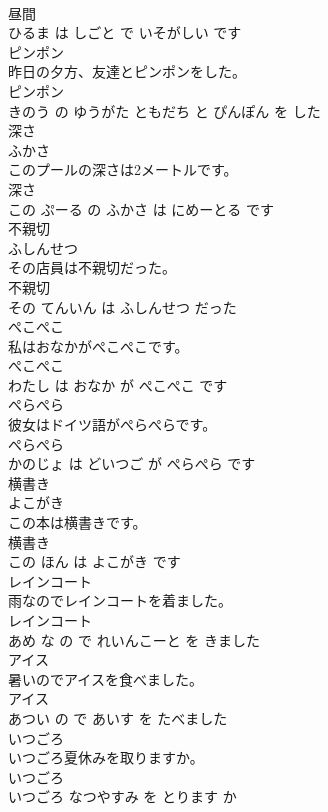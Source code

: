\documentclass[8pt]{extreport}
\begin{document}
\begin{CJK}{UTF8}{min}
\\	昼間 
\\	ひるま は しごと で いそがしい です			
\\	ピンポン	
\\	昨日の夕方、友達とピンポンをした。	
\\	ピンポン 
\\	きのう の ゆうがた ともだち と ぴんぽん を した			
\\	深さ	
\\	ふかさ			
\\	このプールの深さは2メートルです。	
\\	深さ 
\\	この ぷーる の ふかさ は にめーとる です			
\\	不親切	
\\	ふしんせつ			
\\	その店員は不親切だった。	
\\	不親切 
\\	その てんいん は ふしんせつ だった			
\\	ぺこぺこ	
\\	私はおなかがぺこぺこです。	
\\	ぺこぺこ 
\\	わたし は おなか が ぺこぺこ です			
\\	ぺらぺら	
\\	彼女はドイツ語がぺらぺらです。	
\\	ぺらぺら 
\\	かのじょ は どいつご が ぺらぺら です			
\\	横書き	
\\	よこがき			
\\	この本は横書きです。	
\\	横書き 
\\	この ほん は よこがき です			
\\	レインコート	
\\	雨なのでレインコートを着ました。	
\\	レインコート 
\\	あめ な の で れいんこーと を きました			
\\	アイス	
\\	暑いのでアイスを食べました。	
\\	アイス 
\\	あつい の で あいす を たべました			
\\	いつごろ	
\\	いつごろ夏休みを取りますか。	
\\	いつごろ 
\\	いつごろ なつやすみ を とります か			

\end{CJK}
\end{document}
